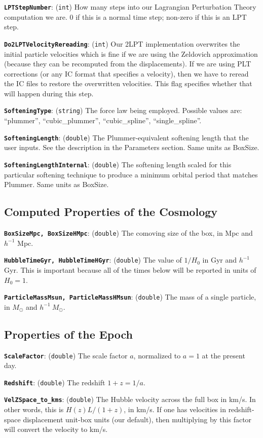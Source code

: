 \documentclass[11pt,preprint]{aastex}
\newcommand{\param}[2]{\medskip\noindent\textbf{\texttt{#1}}: ({\tt #2}) }
\begin{document}
\param{LPTStepNumber}{int} How many steps into our Lagrangian Perturbation Theory computation we are.  0 if this is a normal time step; non-zero if this is an LPT step.

\param{Do2LPTVelocityRereading}{int} Our 2LPT implementation overwrites the initial particle velocities which is fine if we are using the Zeldovich approximation (because they can be recomputed from the displacements).  If we are using PLT corrections (or any IC format that specifies a velocity), then we have to reread the IC files to restore the overwritten velocities.  This flag specifies whether that will happen during this step.

\param{SofteningType}{string} The force law being employed.  Possible
values are: ``plummer'', ``cubic\_plummer'', ``cubic\_spline'', ``single\_spline''.

\param{SofteningLength}{double} The Plummer-equivalent softening length
that the user inputs.  See the description in the Parameters section.
Same units as BoxSize.

\param{SofteningLengthInternal}{double} The softening length scaled
for this particular softening technique to produce a minimum orbital
period that matches Plummer.  Same units as BoxSize.


\subsection{Computed Properties of the Cosmology}

\param{BoxSizeMpc, BoxSizeHMpc}{double} The comoving size of the
box, in Mpc and $h^{-1}$ Mpc.

\param{HubbleTimeGyr, HubbleTimeHGyr}{double} The value of $1/H_0$
in Gyr and $h^{-1}$ Gyr.  This is important because all of the times
below will be reported in units of $H_0=1$.

\param{ParticleMassMsun, ParticleMassHMsun}{double} The mass of a
single particle, in $M_\odot$ and $h^{-1}\ M_\odot$.

\subsection{Properties of the Epoch}

\param{ScaleFactor}{double} The scale factor $a$, normalized to $a=1$ 
at the present day.

\param{Redshift}{double} The redshift $1+z = 1/a$.

\param{VelZSpace\_to\_kms}{double} The Hubble velocity across
the full box in km/s.  In other words, this is $H(z)L/(1+z)$, in
km/s.  If one has velocities in redshift-space displacement unit-box 
units (our default), then multiplying by this factor will convert the
velocity to km/s.
\end{document}
